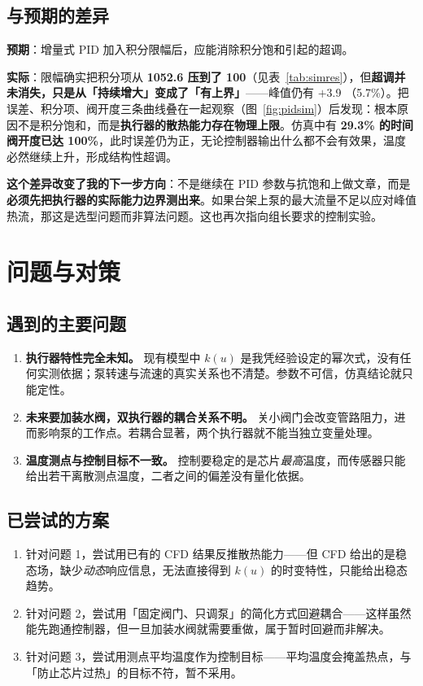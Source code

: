 \documentclass[stage2]{ydzjreport}
\begin{document}
\subsection{与预期的差异}

\textbf{预期}：增量式 PID 加入积分限幅后，应能消除积分饱和引起的超调。

\textbf{实际}：限幅确实把积分项从 \textbf{1052.6 压到了 100}（见表~\ref{tab:simres}），但\textbf{超调并未消失，只是从「持续增大」变成了「有上界」}——峰值仍有 $+$3.9 \textcelsius（5.7\%）。把误差、积分项、阀开度三条曲线叠在一起观察（图~\ref{fig:pidsim}）后发现：根本原因不是积分饱和，而是\textbf{执行器的散热能力存在物理上限}。仿真中有 \textbf{29.3\% 的时间阀开度已达 100\%}，此时误差仍为正，无论控制器输出什么都不会有效果，温度必然继续上升，形成结构性超调。

\textbf{这个差异改变了我的下一步方向}：不是继续在 PID 参数与抗饱和上做文章，而是\textbf{必须先把执行器的实际能力边界测出来}。如果台架上泵的最大流量不足以应对峰值热流，那这是选型问题而非算法问题。这也再次指向组长要求的控制实验。

\section{问题与对策}

\subsection{遇到的主要问题}

\begin{enumerate}
  \item \textbf{执行器特性完全未知。} 现有模型中 $k(u)$ 是我凭经验设定的幂次式，没有任何实测依据；泵转速与流速的真实关系也不清楚。参数不可信，仿真结论就只能定性。
  \item \textbf{未来要加装水阀，双执行器的耦合关系不明。} 关小阀门会改变管路阻力，进而影响泵的工作点。若耦合显著，两个执行器就不能当独立变量处理。
  \item \textbf{温度测点与控制目标不一致。} 控制要稳定的是芯片\emph{最高}温度，而传感器只能给出若干离散测点温度，二者之间的偏差没有量化依据。
\end{enumerate}

\subsection{已尝试的方案}

\begin{enumerate}
  \item 针对问题 1，尝试用已有的 CFD 结果反推散热能力——但 CFD 给出的是稳态场，缺少\emph{动态}响应信息，无法直接得到 $k(u)$ 的时变特性，只能给出稳态趋势。
  \item 针对问题 2，尝试用「固定阀门、只调泵」的简化方式回避耦合——这样虽然能先跑通控制器，但一旦加装水阀就需要重做，属于暂时回避而非解决。
  \item 针对问题 3，尝试用测点平均温度作为控制目标——平均温度会掩盖热点，与「防止芯片过热」的目标不符，暂不采用。
\end{enumerate}
\end{document}

